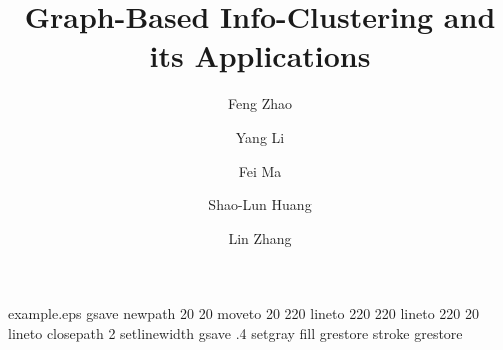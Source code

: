 %
%
%
%
\begin{filecontents*}{example.eps}
gsave
newpath
  20 20 moveto
  20 220 lineto
  220 220 lineto
  220 20 lineto
closepath
2 setlinewidth
gsave
  .4 setgray fill
grestore
stroke
grestore
\end{filecontents*}
%
\RequirePackage{fix-cm}
%
\documentclass[smallextended]{svjour3}       %
%
\smartqed  %
%
\usepackage{graphicx}
\usepackage{amsmath}
\usepackage{amssymb}
\usepackage{natbib}
\usepackage{bm}
\usepackage{subcaption}
\captionsetup{compatibility=false}

%
%
%
%
%


\title{Graph-Based Info-Clustering and its Applications%
}


\author{Feng Zhao         \and
        Yang Li \and %
        Fei Ma \and
        Shao-Lun Huang \and
        Lin Zhang
}

